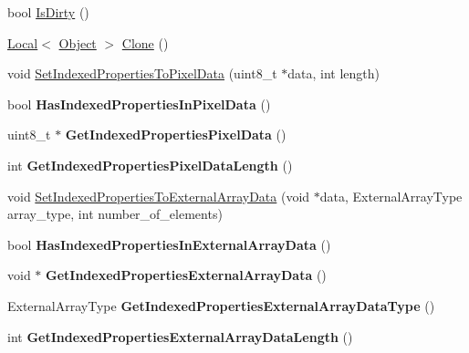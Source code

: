 \begin{DoxyCompactItemize}
\item 
bool \hyperlink{classv8_1_1_object_a3c1f8cfb754b5d29d5f1998b2047befd}{Is\+Dirty} ()
\item 
\hyperlink{classv8_1_1_local}{Local}$<$ \hyperlink{classv8_1_1_object}{Object} $>$ \hyperlink{classv8_1_1_object_a5018c9d085aa71f65530cf1e073a04ad}{Clone} ()
\item 
void \hyperlink{classv8_1_1_object_a6c552c4817b9a0eff1fb12b7ef089026}{Set\+Indexed\+Properties\+To\+Pixel\+Data} (uint8\+\_\+t $\ast$data, int length)
\item 
\hypertarget{classv8_1_1_object_a984cb47ed59b73d3d1b32f393a653cd4}{}bool {\bfseries Has\+Indexed\+Properties\+In\+Pixel\+Data} ()\label{classv8_1_1_object_a984cb47ed59b73d3d1b32f393a653cd4}

\item 
\hypertarget{classv8_1_1_object_af2cefd0bcc50b19bb23b93b493ceb3d2}{}uint8\+\_\+t $\ast$ {\bfseries Get\+Indexed\+Properties\+Pixel\+Data} ()\label{classv8_1_1_object_af2cefd0bcc50b19bb23b93b493ceb3d2}

\item 
\hypertarget{classv8_1_1_object_ac6af430db5a41a0c9b6cacb507d95e0d}{}int {\bfseries Get\+Indexed\+Properties\+Pixel\+Data\+Length} ()\label{classv8_1_1_object_ac6af430db5a41a0c9b6cacb507d95e0d}

\item 
void \hyperlink{classv8_1_1_object_a530f661dec20ce1a0a1b15a45195418c}{Set\+Indexed\+Properties\+To\+External\+Array\+Data} (void $\ast$data, External\+Array\+Type array\+\_\+type, int number\+\_\+of\+\_\+elements)
\item 
\hypertarget{classv8_1_1_object_ae3c884315aaba6d11d3663a8569fe8f1}{}bool {\bfseries Has\+Indexed\+Properties\+In\+External\+Array\+Data} ()\label{classv8_1_1_object_ae3c884315aaba6d11d3663a8569fe8f1}

\item 
\hypertarget{classv8_1_1_object_a7763a639b0ec6d35f645d0d2facfd8ce}{}void $\ast$ {\bfseries Get\+Indexed\+Properties\+External\+Array\+Data} ()\label{classv8_1_1_object_a7763a639b0ec6d35f645d0d2facfd8ce}

\item 
\hypertarget{classv8_1_1_object_a02e0652188d3a9c557b07ac2ba037b23}{}External\+Array\+Type {\bfseries Get\+Indexed\+Properties\+External\+Array\+Data\+Type} ()\label{classv8_1_1_object_a02e0652188d3a9c557b07ac2ba037b23}

\item 
\hypertarget{classv8_1_1_object_a9aa725628f4d3371999663e6611efeb3}{}int {\bfseries Get\+Indexed\+Properties\+External\+Array\+Data\+Length} ()\label{classv8_1_1_object_a9aa725628f4d3371999663e6611efeb3}

\end{DoxyCompactItemize}

